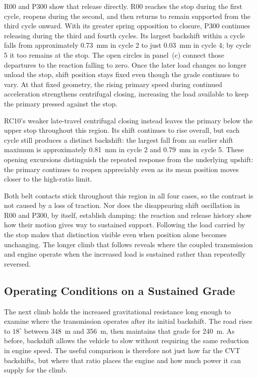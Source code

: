 \documentclass[11pt]{report}
\numberwithin{equation}{section}
\begin{document}
R00 and P300 show that release directly. R00 reaches the stop during the
first cycle, reopens during the second, and then returns to remain supported
from the third cycle onward. With its greater spring opposition to closure,
P300 continues releasing during the third and fourth cycles. Its largest
backshift within a cycle falls from approximately
\SI{0.73}{mm} in cycle 2 to just \SI{0.03}{mm} in cycle 4; by cycle 5 it too
remains at the stop. The open circles in panel~(c) connect those departures
to the reaction falling to zero. Once the later load changes no longer
unload the stop, shift position stays fixed even though the grade continues
to vary. At that fixed geometry, the rising primary speed during continued
acceleration strengthens centrifugal closing, increasing the load available
to keep the primary pressed against the stop.

RC10's weaker late-travel centrifugal closing instead leaves the primary
below the upper stop throughout this region. Its shift continues to
rise overall, but each cycle still produces a distinct backshift: the
largest fall from an earlier shift maximum is approximately
\SI{0.81}{mm} in cycle 2 and \SI{0.79}{mm} in cycle 5. These opening
excursions distinguish the repeated response from the underlying upshift:
the primary continues to reopen appreciably even as its mean position moves
closer to the high-ratio limit.

Both belt contacts stick throughout this region in all four cases, so the
contrast is not caused by a loss of traction. Nor does the disappearing
shift oscillation in R00 and P300, by itself, establish damping: the reaction
and release history show how their motion gives way to sustained support.
Following the load carried by the stop makes that distinction visible even
when position alone becomes unchanging. The longer climb that follows reveals where the coupled transmission
and engine operate when the increased load is sustained rather than
repeatedly reversed.

\subsection{Operating Conditions on a Sustained Grade}
\label{sec:results_moderate_hill}

The next climb holds the increased gravitational resistance long enough to
examine where the transmission operates after its initial backshift. The
road rises to \(18^\circ\) between \SI{348}{m} and \SI{356}{m}, then maintains
that grade for \SI{240}{m}. As before, backshift allows the vehicle to slow
without requiring the same reduction in engine speed. The useful comparison
is therefore not just how far the
CVT backshifts, but where that ratio places the engine and how much power it
can supply for the climb.
\end{document}
